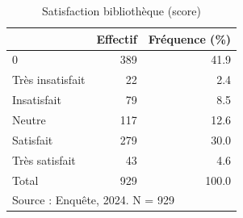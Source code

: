 \begin{table}[htbp]\centering
\def\sym#1{\ifmmode^{#1}\else\(^{#1}\)\fi}
\caption{Satisfaction bibliothèque (score)}
\begin{tabular}{l*{2}{r}}
\toprule
            &    Effectif&Fréquence (\%)\\
\midrule
0           &         389&        41.9\\
Très insatisfait&          22&         2.4\\
Insatisfait &          79&         8.5\\
Neutre      &         117&        12.6\\
Satisfait   &         279&        30.0\\
Très satisfait&          43&         4.6\\
Total       &         929&       100.0\\
\bottomrule
\multicolumn{3}{l}{\footnotesize Source : Enquête, 2024. N = 929}\\
\end{tabular}
\end{table}

